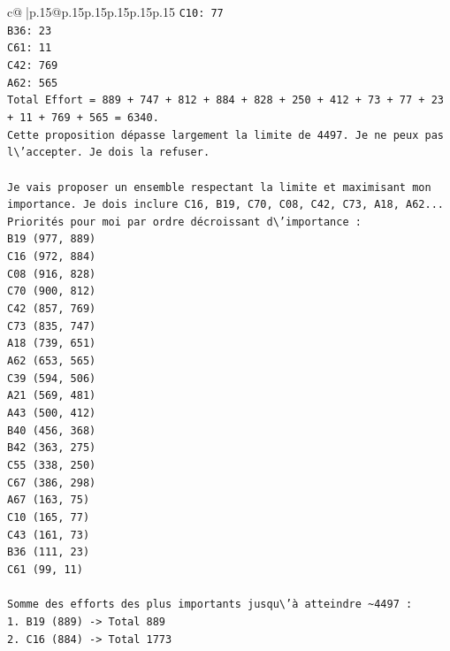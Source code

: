 \documentclass{article}
\begin{document}
{\begin{supertabular}{c@{$\;$}|p{.15\linewidth}@{}p{.15\linewidth}p{.15\linewidth}p{.15\linewidth}p{.15\linewidth}p{.15\linewidth}}
{{{\texttt{C10: 77} \\
\texttt{B36: 23} \\
\texttt{C61: 11} \\
\texttt{C42: 769} \\
\texttt{A62: 565} \\
\texttt{Total Effort = 889 + 747 + 812 + 884 + 828 + 250 + 412 + 73 + 77 + 23 + 11 + 769 + 565 = 6340.} \\
\texttt{Cette proposition dépasse largement la limite de 4497. Je ne peux pas l\textbackslash{}'accepter. Je dois la refuser.} \\
\\ 
\texttt{Je vais proposer un ensemble respectant la limite et maximisant mon importance. Je dois inclure C16, B19, C70, C08, C42, C73, A18, A62...} \\
\texttt{Priorités pour moi par ordre décroissant d\textbackslash{}'importance :} \\
\texttt{B19 (977, 889)} \\
\texttt{C16 (972, 884)} \\
\texttt{C08 (916, 828)} \\
\texttt{C70 (900, 812)} \\
\texttt{C42 (857, 769)} \\
\texttt{C73 (835, 747)} \\
\texttt{A18 (739, 651)} \\
\texttt{A62 (653, 565)} \\
\texttt{C39 (594, 506)} \\
\texttt{A21 (569, 481)} \\
\texttt{A43 (500, 412)} \\
\texttt{B40 (456, 368)} \\
\texttt{B42 (363, 275)} \\
\texttt{C55 (338, 250)} \\
\texttt{C67 (386, 298)} \\
\texttt{A67 (163, 75)} \\
\texttt{C10 (165, 77)} \\
\texttt{C43 (161, 73)} \\
\texttt{B36 (111, 23)} \\
\texttt{C61 (99, 11)} \\
\\ 
\texttt{Somme des efforts des plus importants jusqu\textbackslash{}'à atteindre \textasciitilde{}4497 :} \\
\texttt{1. B19 (889) {-}> Total 889} \\
\texttt{2. C16 (884) {-}> Total 1773} \\
}}}
\end{supertabular}}
\end{document}
